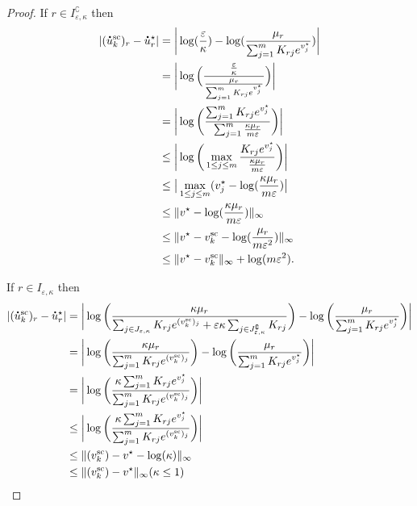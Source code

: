 \begin{proof}
If $r \in I^\complement_{\varepsilon, \kappa}$ then 
\begin{align*}
|(\dt{u}^{\text{sc}}_k)_{r} - \dt{u}^\star_r| &= \bigg| \log(\frac \varepsilon\kappa) - \log(\frac{\mu_r}{\sum_{j=1}^m K_{rj}e^{v^\star_j}})\bigg|\\
&= \bigg|\log\Big(\frac{\frac \varepsilon\kappa}{\frac{\mu_r}{\sum_{j=1}^m K_{rj}e^{v^\star_j}}}\Big) \bigg|\\
&= \bigg|\log\bigg(\frac{\sum_{j=1}^m K_{rj}e^{v^\star_j}}{\sum_{j=1}^m \frac{\kappa \mu_r}{m\varepsilon}}\bigg) \bigg|\\
& \leq \bigg|\log\bigg(\max_{1\leq j \leq m} \frac{K_{rj}e^{v^\star_j}}{\frac{\kappa \mu_r}{m\varepsilon}}\bigg) \bigg|\\
& \leq \big|\max_{1\leq j \leq m} (v_j^\star - \log(\frac{\kappa \mu_r}{m\varepsilon})\big|\\
& \leq \norm{v^\star - \log(\frac{\kappa \mu_r}{m\varepsilon})}_\infty \\
& \leq \norm{v^\star - v^{\text{sc}}_k - \log(\frac{\mu_r}{m\varepsilon^2})}_\infty \\
& \leq \norm{v^\star - v^{\text{sc}}_k}_\infty +  \log(m\varepsilon^2).
\end{align*}

If $r \in I_{\varepsilon, \kappa}$ then 
\begin{align*}
|(\dt{u}^{\text{sc}}_k)_{r} - \dt{u}^\star_r| &= \bigg|\log\bigg(\frac{\kappa\mu_r}{\sum_{j\in J_{\varepsilon,\kappa}}K_{rj}e^{(v^{\text{sc}}_k)_j} + \varepsilon\kappa \sum_{j\in J^\complement_{\varepsilon,\kappa}}K_{rj}}\bigg) - \log\bigg(\frac{\mu_r}{\sum_{j=1}^m K_{rj}e^{v^\star_j}}\bigg)\bigg|\\
&= \bigg|\log\bigg(\frac{\kappa\mu_r}{\sum_{j=1}^m K_{rj}e^{(v^{\text{sc}}_k)_j}}\bigg) - \log\bigg(\frac{\mu_r}{\sum_{j=1}^m K_{rj}e^{v^\star_j}}\bigg)\bigg|\\
&= \bigg|\log\bigg(\frac{\kappa\sum_{j=1}^m K_{rj}e^{v^\star_j}}{\sum_{j=1}^m K_{rj}e^{(v^{\text{sc}}_k)_j}}\bigg)\bigg|\\
& \leq \bigg|\log\bigg(\frac{\kappa\sum_{j=1}^m K_{rj}e^{v^\star_j}}{\sum_{j=1}^m K_{rj}e^{(v^{\text{sc}}_k)_j}}\bigg)\bigg|\\
& \leq \norm{(v^{\text{sc}}_k) - v^\star - \log(\kappa)}_\infty\\
& \leq \norm{(v^{\text{sc}}_k) - v^\star}_\infty (\kappa \leq 1)
\end{align*}


\end{proof}
